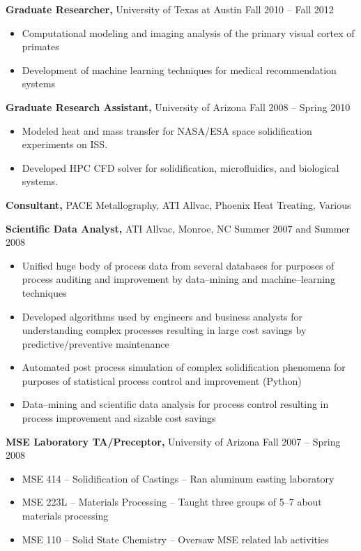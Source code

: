 \documentclass{res}
\begin{document}
\begin{resume}
{\bf Graduate Researcher,} University of Texas at Austin \hfill
Fall 2010 -- Fall 2012
\begin{itemize} \itemsep -2pt
\item Computational modeling and imaging analysis of the primary visual cortex of primates
\item Development of machine learning techniques for medical recommendation systems
\end{itemize}
{\bf Graduate Research Assistant,} University of Arizona \hfill
Fall 2008 -- Spring 2010
\begin{itemize} \itemsep -2pt
\item Modeled heat and mass transfer for NASA/ESA space solidification experiments on ISS.
\item Developed HPC CFD solver for solidification, microfluidics, and biological systems.
\end{itemize}

{\bf Consultant,} PACE Metallography, ATI Allvac, Phoenix Heat Treating, \hfill Various

{\bf Scientific Data Analyst,} ATI Allvac, Monroe, NC \hfill
Summer 2007 and Summer 2008
\begin{itemize} \itemsep -2pt
\item Unified huge body of process data from several databases for purposes of
  process auditing and improvement by data--mining and machine--learning techniques
\item Developed algorithms used by engineers and business analysts for understanding
  complex processes resulting in large cost savings by predictive/preventive maintenance
\item Automated post process
   simulation of complex solidification phenomena for purposes of
   statistical process control and improvement (Python)
\item Data--mining and scientific data analysis for process control resulting
  in process improvement and sizable cost savings
\end{itemize}

{\bf MSE Laboratory TA/Preceptor,} University of Arizona \hfill Fall 2007 -- Spring 2008
\begin{itemize} \itemsep -2pt
\item MSE 414 -- Solidification of Castings -- Ran aluminum casting laboratory
\item MSE 223L -- Materials Processing -- Taught three groups of 5--7
  about materials processing
\item MSE 110 -- Solid State Chemistry -- Oversaw MSE related lab
  activities
\end{itemize}


\end{resume}
\end{document}
